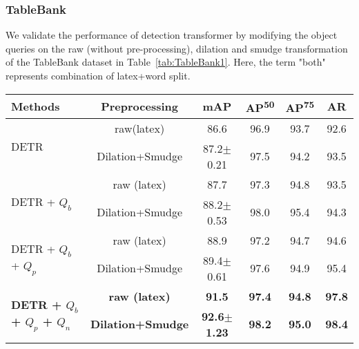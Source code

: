 \documentclass[sn-mathphys]{sn-jnl}\jyear{2021}\theoremstyle{thmstyleone}\newtheorem{theorem}{Theorem}\newtheorem{proposition}[theorem]{Proposition}\theoremstyle{thmstyletwo}\newtheorem{example}{Example}\newtheorem{remark}{Remark}\theoremstyle{thmstylethree}\newtheorem{definition}{Definition}\usepackage{amsmath}
\begin{document}
\subsubsection{TableBank}
\label{sec:TableBank-results}
We validate the performance of detection transformer by modifying the object queries on the raw (without pre-processing), dilation and smudge transformation of the TableBank dataset in Table~\ref{tab:TableBank1}. Here, the term "both" represents combination of latex+word split.  
\begin{table*}
\tiny
\begin{center}
\caption{Comparison between transformer-based detector results on raw (without pre-processing), dilation and smudge transformation of the TableBank dataset. Here, term $Q_b$ represents object queries as anchor boxes, $Q_p$ denotes object queries with positive noise and $Q_n$ indicates object queries with negative noise. The IoU thresholds are set to 0.5 and 0.75 for average precision calculation and also calculate average recall for large objects. AR represents Average Recall for a large area. The best results are highlighted.}\label{tab:TableBank1}
\renewcommand{\arraystretch}{1} \begin{tabular*}{\textwidth}{@{\extracolsep{\fill}}lccccc@{\extracolsep{\fill}}}
\toprule
\textbf{Methods} &
\textbf{Preprocessing} &
\textbf{mAP} & 
\textbf{AP\textsuperscript{50}} &
\textbf{AP\textsuperscript{75}}  & \textbf{AR} \\
\midrule
\multirow{2}{*}{DETR} & raw(latex) & 86.6& 96.9 & 93.7& 92.6\\
& Dilation+Smudge & 87.2$\pm$0.21 & 97.5 & 94.2 & 93.5\\
\midrule

\multirow{2}{*}{DETR + $Q_b$} & raw (latex)  & 87.7 & 97.3 & 94.8  & 93.5\\
& Dilation+Smudge  & 88.2$\pm$0.53 & 98.0 & 95.4 & 94.3\\
\midrule

\multirow{2}{*}{DETR + $Q_b$ + $Q_p$} & raw (latex)  & 88.9 & 97.2 & 94.7 & 94.6 \\
& Dilation+Smudge  & 89.4$\pm$0.61 & 97.6 & 94.9 & 95.4\\
\midrule

\multirow{2}{*}{\textbf{DETR + $Q_b$ + $Q_p$ + $Q_n$}} & \textbf{raw (latex)} & \textbf{91.5} & \textbf{97.4} & \textbf{94.8} & \textbf{97.8}\\
& \textbf{Dilation+Smudge} & \textbf{92.6$\pm$1.23} & \textbf{98.2} & \textbf{95.0} & \textbf{98.4}\\
\midrule


\end{tabular*}
\end{center}
\end{table*}
\end{document}

